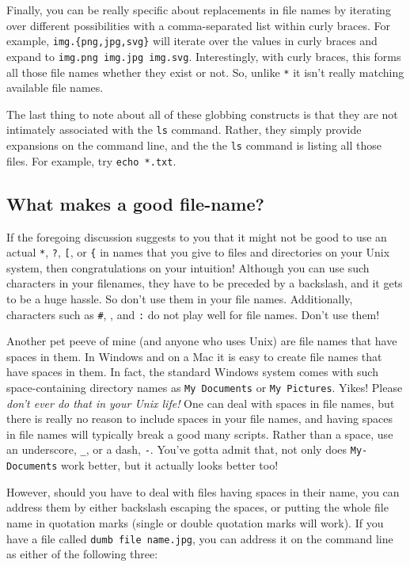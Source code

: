 \documentclass[]{krantz}
\begin{document}
Finally, you can be really specific about replacements in file names by iterating over
different possibilities with a comma-separated list within curly braces. For example, \texttt{img.\{png,jpg,svg\}}
will iterate over the values in curly braces and expand to \texttt{img.png\ img.jpg\ img.svg}. Interestingly,
with curly braces, this forms all those file names whether they exist or not. So, unlike \texttt{*} it isn't
really matching available file names.

The last thing to note about all of these globbing constructs is that they are not intimately
associated with the \texttt{ls} command. Rather, they simply provide expansions on the command
line, and the the \texttt{ls} command is listing all those files. For example, try \texttt{echo\ *.txt}.

\hypertarget{what-makes-a-good-file-name}{%
\subsection{What makes a good file-name?}\label{what-makes-a-good-file-name}}

If the foregoing discussion suggests to you that it might not be good to use an
actual \texttt{*}, \texttt{?}, \texttt{{[}}, or \texttt{\{} in names that you give to files and directories
on your Unix system, then congratulations on your intuition! Although you can use
such characters in your filenames, they have to be preceded by a backslash, and it
gets to be a huge hassle. So don't use them in your file names. Additionally,
characters such as \texttt{\#}, \texttt{\textbar{}}, and \texttt{:} do not play well for file names. Don't use them!

Another pet peeve of mine (and anyone who uses Unix) are file names that have spaces in them.
In Windows and on a Mac it is easy to create file names that have spaces in them. In fact, the
standard Windows system comes with such space-containing directory names as \texttt{My\ Documents} or \texttt{My\ Pictures}. Yikes! Please \emph{don't ever do that in your Unix life!} One can deal with spaces in file
names, but there is really no reason to include spaces in your file names, and having spaces in file
names will typically break a good many scripts. Rather than a space, use an underscore, \texttt{\_}, or a
dash, \texttt{-}. You've gotta admit that, not only does \texttt{My-Documents} work better, but it actually
looks better too!

However, should you have to deal with files having spaces in their name, you can
address them by either backslash escaping the spaces, or putting the whole
file name in quotation marks (single or double quotation marks will work).
If you have a file called \texttt{dumb\ file\ name.jpg}, you can address it on the
command line as either of the following three:
\end{document}
